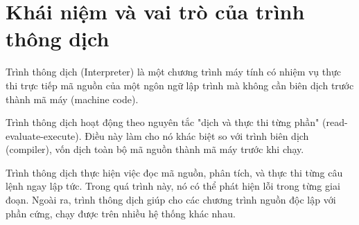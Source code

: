 \section{Khái niệm và vai trò của trình thông dịch}

Trình thông dịch (Interpreter) là một chương trình máy tính có nhiệm vụ thực thi trực tiếp mã nguồn của một ngôn ngữ lập trình mà không cần biên dịch trước thành mã máy (machine code).

Trình thông dịch hoạt động theo nguyên tắc "dịch và thực thi từng phần" (read-evaluate-execute). Điều này làm cho nó khác biệt so với trình biên dịch (compiler), vốn dịch toàn bộ mã nguồn thành mã máy trước khi chạy.

Trình thông dịch thực hiện việc đọc mã nguồn, phân tích, và thực thi từng câu lệnh ngay lập tức. Trong quá trình này, nó có thể phát hiện lỗi trong từng giai đoạn. Ngoài ra, trình thông dịch giúp cho các chương trình nguồn độc lập với phần cứng, chạy được trên nhiều hệ thống khác nhau.

% 
% 
